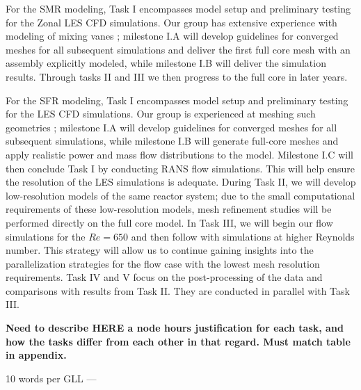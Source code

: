 For the SMR modeling, Task I encompasses model setup and preliminary testing for
the Zonal LES CFD simulations. Our group has extensive experience with modeling of mixing vanes \cite{busco2019invariant}; milestone I.A will develop guidelines for converged meshes for all subsequent simulations and deliver the first full core mesh with an assembly explicitly modeled, while milestone
I.B will deliver the simulation results.  Through tasks II and III we then progress to the full core in later years.

For the SFR modeling, Task I encompasses model setup and preliminary testing for
the LES CFD simulations. Our group is experienced at meshing such geometries \cite{merzari2020toward}; milestone
I.A will develop guidelines for converged meshes for all subsequent simulations, while milestone
I.B will generate full-core meshes and apply realistic power and mass flow distributions to the model.
Milestone I.C will then conclude Task I by conducting RANS flow simulations. This will help ensure the resolution of the LES simulations is adequate.
During Task II, we will develop low-resolution models of the same reactor system;
due to the small computational requirements of these low-resolution models, mesh
refinement studies will be performed directly on the full core model. In Task
III, we will begin our flow simulations for the \(Re=650\) and then follow with
simulations at higher Reynolds number. This strategy will allow us to continue
gaining insights into the parallelization strategies for the flow case with the
lowest mesh resolution requirements. Task IV and V focus on the post-processing
of the data and comparisons with results from Task II. They are conducted in
parallel with Task III.

{\bf Need to describe HERE a node hours justification for each task, and how the tasks differ from each other in that regard. Must match table in appendix.}





10 words per GLL --- 

